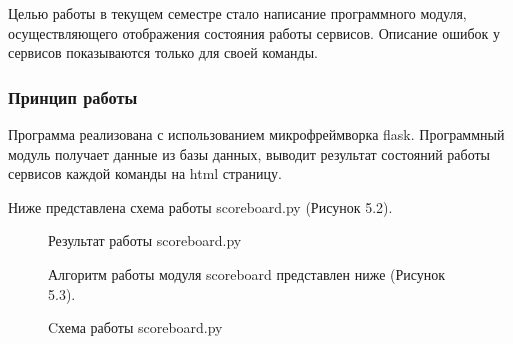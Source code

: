 Целью работы в текущем семестре стало написание программного модуля, осуществляющего отображения состояния работы сервисов. Описание ошибок у сервисов показываются только для своей команды.

\subsubsection{Принцип работы}

Программа реализована с использованием микрофреймворка flask. Программный модуль получает данные из базы данных, выводит результат состояний работы сервисов каждой команды на html страницу.

Ниже представлена схема работы scoreboard.py (Рисунок 5.2).

\begin{figure}[ht!]
\caption{Результат работы scoreboard.py}
\end{figure}

\begin{figure}[ht!]
Алгоритм работы модуля scoreboard представлен ниже (Рисунок 5.3).
\caption{Cхема работы scoreboard.py}
\end{figure}


\clearpage